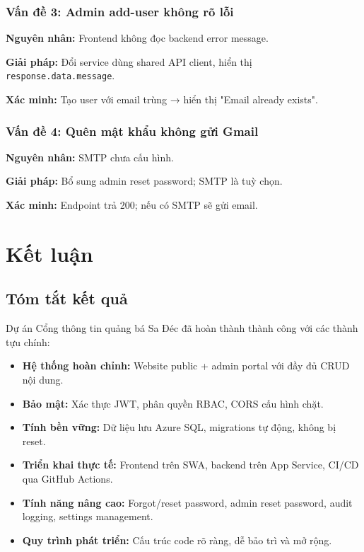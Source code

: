 \documentclass[12pt,a4paper,oneside]{report}
\newcommand{\ProjectName}{Cổng thông tin quảng bá Sa Đéc}
\begin{document}
\subsection{Vấn đề 3: Admin add-user không rõ lỗi}

\textbf{Nguyên nhân:} Frontend không đọc backend error message.

\textbf{Giải pháp:} Đổi service dùng shared API client, hiển thị \texttt{response.data.message}.

\textbf{Xác minh:} Tạo user với email trùng → hiển thị "Email already exists".

\subsection{Vấn đề 4: Quên mật khẩu không gửi Gmail}

\textbf{Nguyên nhân:} SMTP chưa cấu hình.

\textbf{Giải pháp:} Bổ sung admin reset password; SMTP là tuỳ chọn.

\textbf{Xác minh:} Endpoint trả 200; nếu có SMTP sẽ gửi email.


\chapter{Kết luận}

\section{Tóm tắt kết quả}

Dự án \ProjectName{} đã hoàn thành thành công với các thành tựu chính:

\begin{itemize}[itemsep=3pt]
  \item \textbf{Hệ thống hoàn chỉnh:} Website public + admin portal với đầy đủ CRUD nội dung.
  
  \item \textbf{Bảo mật:} Xác thực JWT, phân quyền RBAC, CORS cấu hình chặt.
  
  \item \textbf{Tính bền vững:} Dữ liệu lưu Azure SQL, migrations tự động, không bị reset.
  
  \item \textbf{Triển khai thực tế:} Frontend trên SWA, backend trên App Service, CI/CD qua GitHub Actions.
  
  \item \textbf{Tính năng nâng cao:} Forgot/reset password, admin reset password, audit logging, settings management.
  
  \item \textbf{Quy trình phát triển:} Cấu trúc code rõ ràng, dễ bảo trì và mở rộng.
\end{itemize}
\end{document}
